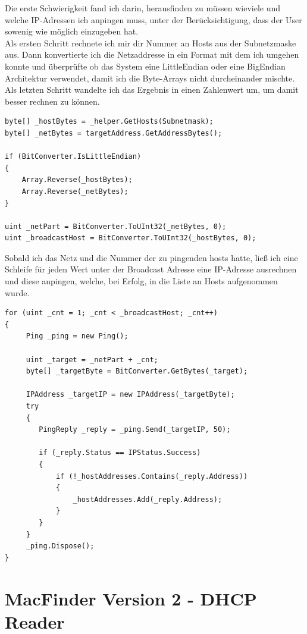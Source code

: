 \documentclass[12pt,a4paper]{report}
\begin{document}
\begin{onehalfspace}
Die erste Schwierigkeit fand ich darin, herausfinden zu müssen wieviele und welche IP-Adressen ich anpingen muss, unter der Berücksichtigung, dass der User sowenig wie möglich einzugeben hat.\\
Als ersten Schritt rechnete ich mir dir Nummer an Hosts aus der Subnetzmaske aus. Dann konvertierte ich die Netzaddresse in ein Format mit dem ich umgehen konnte und überprüfte ob das System eine LittleEndian oder eine BigEndian Architektur verwendet, damit ich die Byte-Arrays nicht durcheinander mischte.\\
Als letzten Schritt wandelte ich das Ergebnis in einen Zahlenwert um, um damit besser rechnen zu können.
\begin{lstlisting}
byte[] _hostBytes = _helper.GetHosts(Subnetmask);
byte[] _netBytes = targetAddress.GetAddressBytes();

if (BitConverter.IsLittleEndian)
{
	Array.Reverse(_hostBytes);
    Array.Reverse(_netBytes);
}

uint _netPart = BitConverter.ToUInt32(_netBytes, 0);
uint _broadcastHost = BitConverter.ToUInt32(_hostBytes, 0);
\end{lstlisting}

Sobald ich das Netz und die Nummer der zu pingenden hosts hatte, ließ ich eine Schleife für jeden Wert unter der Broadcast Adresse eine IP-Adresse ausrechnen und diese anpingen, welche, bei Erfolg, in die Liste an Hosts aufgenommen wurde.

\begin{lstlisting}
for (uint _cnt = 1; _cnt < _broadcastHost; _cnt++)
{
     Ping _ping = new Ping();

     uint _target = _netPart + _cnt;
     byte[] _targetByte = BitConverter.GetBytes(_target);

     IPAddress _targetIP = new IPAddress(_targetByte);
     try
     {
     	PingReply _reply = _ping.Send(_targetIP, 50);
	 	
	 	if (_reply.Status == IPStatus.Success)
     	{
     		if (!_hostAddresses.Contains(_reply.Address))
     		{
     			_hostAddresses.Add(_reply.Address);
	 		}
     	}
     }
     _ping.Dispose();
}
\end{lstlisting}

\section{MacFinder Version 2 - DHCP Reader}

\end{onehalfspace}
\end{document}
